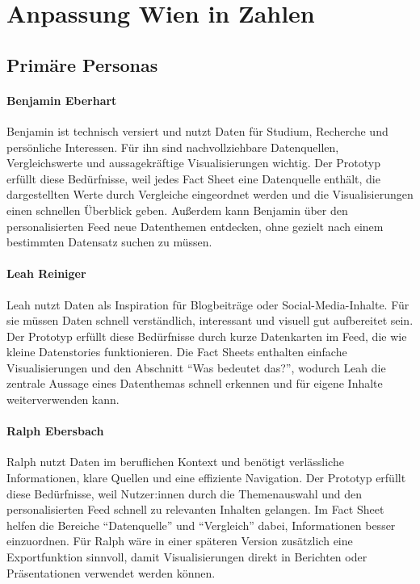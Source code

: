 \section{Anpassung Wien in Zahlen}

\subsection{Prim\"are Personas}

\paragraph{Benjamin Eberhart}
Benjamin ist technisch versiert und nutzt Daten f\"ur Studium, Recherche und pers\"onliche Interessen. F\"ur ihn sind nachvollziehbare Datenquellen, Vergleichswerte und aussagekr\"aftige Visualisierungen wichtig. Der Prototyp erf\"ullt diese Bed\"urfnisse, weil jedes Fact Sheet eine Datenquelle enth\"alt, die dargestellten Werte durch Vergleiche eingeordnet werden und die Visualisierungen einen schnellen \"Uberblick geben. Au\ss{}erdem kann Benjamin \"uber den personalisierten Feed neue Datenthemen entdecken, ohne gezielt nach einem bestimmten Datensatz suchen zu m\"ussen.

\paragraph{Leah Reiniger}
Leah nutzt Daten als Inspiration f\"ur Blogbeitr\"age oder Social-Media-Inhalte. F\"ur sie m\"ussen Daten schnell verst\"andlich, interessant und visuell gut aufbereitet sein. Der Prototyp erf\"ullt diese Bed\"urfnisse durch kurze Datenkarten im Feed, die wie kleine Datenstories funktionieren. Die Fact Sheets enthalten einfache Visualisierungen und den Abschnitt ``Was bedeutet das?'', wodurch Leah die zentrale Aussage eines Datenthemas schnell erkennen und f\"ur eigene Inhalte weiterverwenden kann.

\paragraph{Ralph Ebersbach}
Ralph nutzt Daten im beruflichen Kontext und ben\"otigt verl\"assliche Informationen, klare Quellen und eine effiziente Navigation. Der Prototyp erf\"ullt diese Bed\"urfnisse, weil Nutzer:innen durch die Themenauswahl und den personalisierten Feed schnell zu relevanten Inhalten gelangen. Im Fact Sheet helfen die Bereiche ``Datenquelle'' und ``Vergleich'' dabei, Informationen besser einzuordnen. F\"ur Ralph w\"are in einer sp\"ateren Version zus\"atzlich eine Exportfunktion sinnvoll, damit Visualisierungen direkt in Berichten oder Pr\"asentationen verwendet werden k\"onnen.

